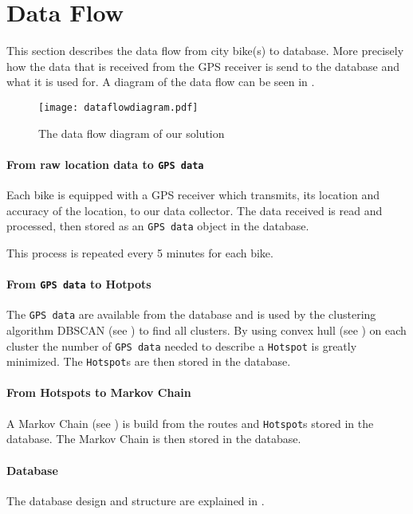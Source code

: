\section{Data Flow}\label{data_flow}
This section describes the data flow from city bike(s) to database. More precisely how the data that is received from the GPS receiver is send to the database and what it is used for.
A diagram of the data flow can be seen in .

\begin{figure}[H]
\texttt{[image: dataflowdiagram.pdf]}
\caption{The data flow diagram of our solution}
\label{fig:dataFlowDiagram}
\end{figure}

\paragraph{From raw location data to \texttt{GPS data}}
Each bike is equipped with a GPS receiver which transmits, its location and accuracy of the location, to our data collector.
The data received is read and processed, then stored as an \texttt{GPS data} object in the database.

This process is repeated every 5 minutes for each bike.

\paragraph{From \texttt{GPS data} to Hotpots}
The \texttt{GPS data} are available from the database and is used by the clustering algorithm DBSCAN (see ) to find all clusters.
By using convex hull (see \cite[page 1031]{aadbook}) on each cluster the number of \texttt{GPS data} needed to describe a \texttt{Hotspot} is greatly minimized.
The \texttt{Hotspot}s are then stored in the database.

\paragraph{From Hotspots to Markov Chain}
A Markov Chain (see ) is build from the routes and \texttt{Hotspot}s stored in the database.
The Markov Chain is then stored in the database.

\paragraph{Database}
The database design and structure are explained in .
